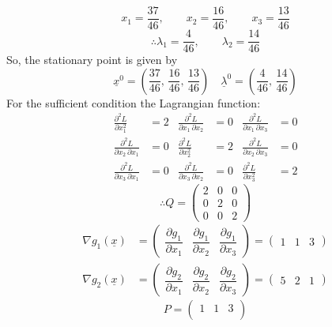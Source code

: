 \documentclass[../main-sheet.tex]{subfiles}
\begin{document}
\begin{soln}
        \[
            x_1=\frac{37}{46},\qquad x_2=\frac{16}{46},\qquad x_3=\frac{13}{46}
        \]
        \[
            \therefore \lambda_1=\frac{4}{46},\qquad \lambda_2=\frac{14}{46}
        \]
        So, the stationary point is given by
        \[
            \underline{x}^0=\left(\frac{37}{46},\,\frac{16}{46},\,\frac{13}{46}\right)\quad \underline{\lambda}^0=\left(\frac{4}{46},\,\frac{14}{46}\right)
        \]
        For the sufficient condition the Lagrangian function:
        \begin{align*}
            \frac{\partial^2 L}{\partial x_1^2}&=2 & \frac{\partial^2 L}{\partial x_1\, \partial x_2}&=0 & \frac{\partial^2 L}{\partial x_1\,\partial x_3}&=0\\
            \frac{\partial^2 L}{\partial x_2\,\partial x_1}&=0 & \frac{\partial^2 L}{\partial x_2^2}&=2 & \frac{\partial^2 L}{\partial x_2\,\partial x_3}&=0\\
            \frac{\partial^2 L}{\partial x_3\,\partial x_1}&=0 & \frac{\partial^2 L}{\partial x_3\,\partial x_2}&=0 & \frac{\partial^2 L}{\partial x_3^2}&=2
        \end{align*}
        \[
            \therefore Q=\begin{pmatrix}
            2&0&0\\
            0&2&0\\
            0&0&2
        \end{pmatrix}
        \]
        \begin{align*}
            \nabla g_1(\underline{x})&=\begin{pmatrix}
                \dfrac{\partial g_1}{\partial x_1}&\dfrac{\partial g_1}{\partial x_2}&\dfrac{\partial g_1}{\partial x_3}
            \end{pmatrix}=\begin{pmatrix}
                1&1&3
            \end{pmatrix}\\
            \nabla g_2(\underline{x})&=\begin{pmatrix}
                \dfrac{\partial g_2}{\partial x_1}&\dfrac{\partial g_2}{\partial x_2}&\dfrac{\partial g_2}{\partial x_3}
            \end{pmatrix}=\begin{pmatrix}
                5&2&1
            \end{pmatrix}
        \end{align*}
        \[P=\begin{pmatrix}
            1&1&3\\

\end{pmatrix}\]
\end{soln}
\end{document}
